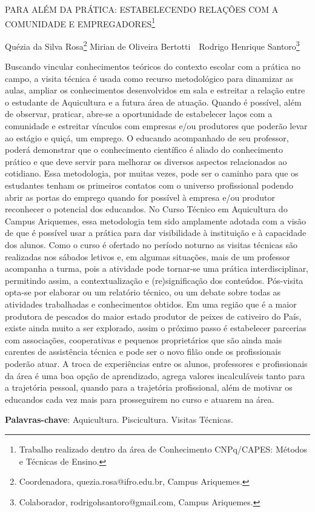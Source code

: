 \documentclass[article,12pt,onesidea,4paper,english,brazil]{abntex2}
\begin{document}
	
	
	\frenchspacing 
	
	\begin{center}
		\LARGE PARA ALÉM DA PRÁTICA: ESTABELECENDO RELAÇÕES COM A
		COMUNIDADE E EMPREGADORES\footnote{Trabalho realizado dentro da área de Conhecimento CNPq/CAPES: Métodos e Técnicas de Ensino.}
		
		\normalsize
	Quézia da Silva Rosa\footnote{Coordenadora, quezia.rosa@ifro.edu.br, Campus Ariquemes.} 
	Mirian de Oliveira Bertotti \,\,
	Rodrigo Henrique Santoro\footnote{Colaborador, rodrigohsantoro@gmail.com, Campus Ariquemes.} 
	\end{center}
	
	\noindent Buscando vincular conhecimentos teóricos do contexto escolar com a prática no
	campo, a visita técnica é usada como recurso metodológico para dinamizar as aulas,
	ampliar os conhecimentos desenvolvidos em sala e estreitar a relação entre o
	estudante de Aquicultura e a futura área de atuação. Quando é possível, além de
	observar, praticar, abre-se a oportunidade de estabelecer laços com a comunidade e
	estreitar vínculos com empresas e/ou produtores que poderão levar ao estágio e
	quiçá, um emprego. O educando acompanhado de seu professor, poderá
	demonstrar que o conhecimento científico é aliado do conhecimento prático e que
	deve servir para melhorar os diversos aspectos relacionados ao cotidiano. Essa
	metodologia, por muitas vezes, pode ser o caminho para que os estudantes tenham
	os primeiros contatos com o universo profissional podendo abrir as portas do
	emprego quando for possível à empresa e/ou produtor reconhecer o potencial dos
	educandos. No Curso Técnico em Aquicultura do Campus Ariquemes, essa
	metodologia tem sido amplamente adotada com a visão de que é possível usar a
	prática para dar visibilidade à instituição e à capacidade dos alunos. Como o curso é
	ofertado no período noturno as visitas técnicas são realizadas nos sábados letivos e,
	em algumas situações, mais de um professor acompanha a turma, pois a atividade
	pode tornar-se uma prática interdisciplinar, permitindo assim, a contextualização e
	(re)significação dos conteúdos. Pós-visita opta-se por elaborar ou um relatório
	técnico, ou um debate sobre todas as atividades trabalhadas e conhecimentos
	obtidos. Em uma região que é a maior produtora de pescados do maior estado
	produtor de peixes de cativeiro do País, existe ainda muito a ser explorado, assim o
	próximo passo é estabelecer parcerias com associações, cooperativas e pequenos
	proprietários que são ainda mais carentes de assistência técnica e pode ser o novo
	filão onde os profissionais poderão atuar. A troca de experiências entre os alunos,
	professores e profissionais da área é uma boa opção de aprendizado, agrega
	valores incalculáveis tanto para a trajetória pessoal, quando para a trajetória
	profissional, além de motivar os educandos cada vez mais para prosseguirem no
	curso e atuarem na área.
	
	\vspace{\onelineskip}
	
	\noindent
	\textbf{Palavras-chave}: Aquicultura. Piscicultura. Visitas Técnicas.
	
\end{document}

